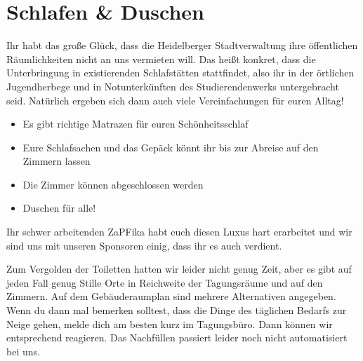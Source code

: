 \section{Schlafen \& Duschen}
  Ihr habt das große Glück, dass die Heidelberger Stadtverwaltung ihre öffentlichen Räumlichkeiten nicht
  an uns vermieten will.
  Das heißt konkret, dass die Unterbringung in existierenden Schlafstätten stattfindet, also ihr
  in der örtlichen Jugendherbege und in Notunterkünften des Studierendenwerks untergebracht seid.
  Natürlich ergeben sich dann auch viele Vereinfachungen für euren Alltag! \\
  \begin{itemize}
    \item Es gibt richtige Matrazen für euren Schönheitsschlaf
    \item Eure Schlafsachen und das Gepäck könnt ihr bis zur Abreise auf den Zimmern lassen
    \item Die Zimmer können abgeschlossen werden
    \item Duschen für alle!
  \end{itemize}


  Ihr schwer arbeitenden ZaPFika habt euch diesen Luxus hart erarbeitet und wir sind uns mit unseren
  Sponsoren einig, dass ihr es auch verdient. 

  Zum Vergolden der Toiletten hatten wir leider nicht genug Zeit, aber es gibt auf jeden Fall genug Stille Orte
  in Reichweite der Tagungsräume und auf den Zimmern. Auf dem Gebäuderaumplan 
  sind mehrere Alternativen angegeben. Wenn du dann mal bemerken solltest, dass die Dinge des täglichen Bedarfs zur Neige gehen, melde dich am besten kurz
  im Tagungsbüro.  Dann können wir entsprechend reagieren. Das Nachfüllen passiert leider noch nicht automatisiert bei uns.
